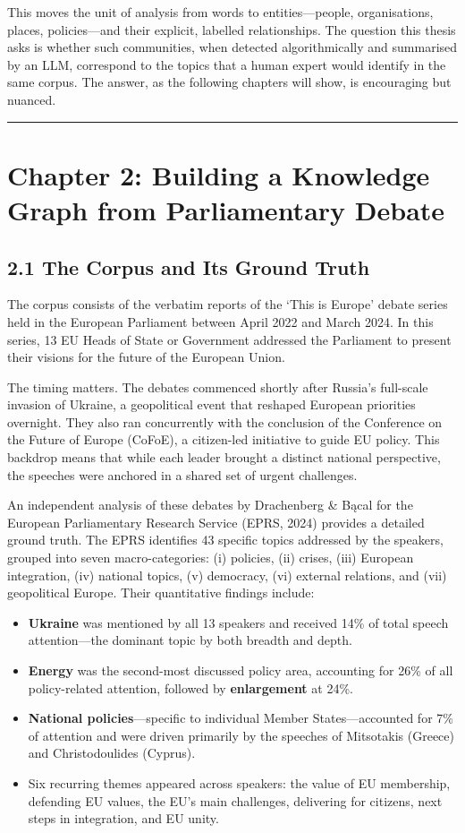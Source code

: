 \documentclass[11pt]{article}
\begin{document}
This moves the unit of analysis from words to entities---people, organisations, places, policies---and their explicit, labelled relationships. The question this thesis asks is whether such communities, when detected algorithmically and summarised by an LLM, correspond to the topics that a human expert would identify in the same corpus. The answer, as the following chapters will show, is encouraging but nuanced.

\hrule

\section{Chapter 2: Building a Knowledge Graph from Parliamentary Debate}

\subsection{2.1 The Corpus and Its Ground Truth}

The corpus consists of the verbatim reports of the `This is Europe' debate series held in the European Parliament between April 2022 and March 2024. In this series, 13 EU Heads of State or Government addressed the Parliament to present their visions for the future of the European Union.

The timing matters. The debates commenced shortly after Russia's full-scale invasion of Ukraine, a geopolitical event that reshaped European priorities overnight. They also ran concurrently with the conclusion of the Conference on the Future of Europe (CoFoE), a citizen-led initiative to guide EU policy. This backdrop means that while each leader brought a distinct national perspective, the speeches were anchored in a shared set of urgent challenges.

An independent analysis of these debates by Drachenberg \& B\k{a}cal for the European Parliamentary Research Service (EPRS, 2024) provides a detailed ground truth. The EPRS identifies 43 specific topics addressed by the speakers, grouped into seven macro-categories: (i) policies, (ii) crises, (iii) European integration, (iv) national topics, (v) democracy, (vi) external relations, and (vii) geopolitical Europe. Their quantitative findings include:

\begin{itemize}
  \item \textbf{Ukraine} was mentioned by all 13 speakers and received 14\% of total speech attention---the dominant topic by both breadth and depth.
  \item \textbf{Energy} was the second-most discussed policy area, accounting for 26\% of all policy-related attention, followed by \textbf{enlargement} at 24\%.
  \item \textbf{National policies}---specific to individual Member States---accounted for 7\% of attention and were driven primarily by the speeches of Mitsotakis (Greece) and Christodoulides (Cyprus).
  \item Six recurring themes appeared across speakers: the value of EU membership, defending EU values, the EU's main challenges, delivering for citizens, next steps in integration, and EU unity.
\end{itemize}
\end{document}
